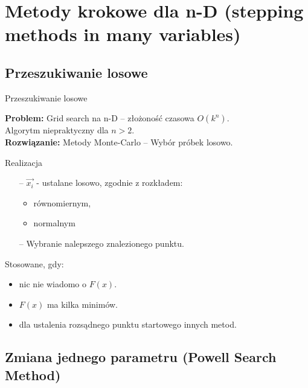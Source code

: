 \section{Metody krokowe dla n-D (stepping methods in many variables)}

\subsection{Przeszukiwanie losowe}
  \begin{frame}{Przeszukiwanie losowe}

    \begin{block}{}
      \textbf{Problem: } Grid search na n-D -- złożoność czasowa $O(k^n)$.\\
      Algorytm niepraktyczny dla $n > 2$.\\
      \textbf{Rozwiązanie: } Metody Monte-Carlo -- Wybór próbek losowo.
    \end{block}

    \begin{block}{Realizacja}
   	  \begin{itemize}
   	  	\item[--] $\vec{x_i}$ - ustalane losowo, zgodnie z rozkładem:
   	  	\begin{itemize}
   		  \item równomiernym,
   		  \item normalnym
   	  	\end{itemize}
   	  	\item[--] Wybranie nalepszego znalezionego punktu.
   	  \end{itemize}
 	  \end{block}

    \begin{block}{}
      Stosowane, gdy:
      \begin{itemize}
        \item nic nie wiadomo o $F(x)$.
        \item $F(x)$ ma kilka minimów.
        \item dla ustalenia rozsądnego punktu startowego innych metod.
      \end{itemize}
    \end{block}
  \end{frame}

\subsection{Zmiana jednego parametru (Powell Search Method)}

